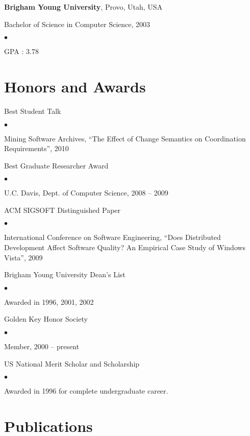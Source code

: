 \documentclass[margin,line,article]{res}
\newenvironment{list1}{
  \begin{list}{}{%
      \setlength{\itemsep}{0in}
      \setlength{\parsep}{0in} \setlength{\parskip}{0in}
      \setlength{\topsep}{0in} \setlength{\partopsep}{0in} 
      \setlength{\leftmargin}{0.17in}}}{\end{list}}
\newenvironment{list2}{
  \begin{list}{$\bullet$}{%
      \setlength{\itemsep}{0in}
      \setlength{\parsep}{0in} \setlength{\parskip}{0in}
      \setlength{\topsep}{0in} \setlength{\partopsep}{0in} 
      \setlength{\leftmargin}{0.2in}}}{\end{list}}
\begin{document}
\begin{resume}
\textbf{Brigham Young University}, Provo, Utah, USA
\begin{list1}
\item Bachelor of Science in Computer Science, 2003
\begin{list2}
\vspace*{.05in}
\item GPA : 3.78
\end{list2}
\end{list1}


\section{Honors and Awards} 

Best Student Talk
\begin{list2}
\item Mining Software Archives, ``The Effect of Change Semantics on Coordination Requirements'', 2010
\end{list2}

Best Graduate Researcher Award
\begin{list2}
\item U.C. Davis, Dept. of Computer Science, 2008 -- 2009
\end{list2}

ACM SIGSOFT Distinguished Paper
\begin{list2}
\item International Conference on Software Engineering, ``Does Distributed Development
Affect Software Quality?  An Empirical Case Study of Windows Vista'', 2009
\end{list2}

Brigham Young University Dean's List
\begin{list2}
\item Awarded in 1996, 2001, 2002
\end{list2}

Golden Key Honor Society
\begin{list2}
\item Member, 2000 -- present
\end{list2}

US National Merit Scholar and Scholarship
\begin{list2}
\item Awarded in 1996 for complete undergraduate career.
\end{list2}

\section{Publications}


\end{resume}
\end{document}
